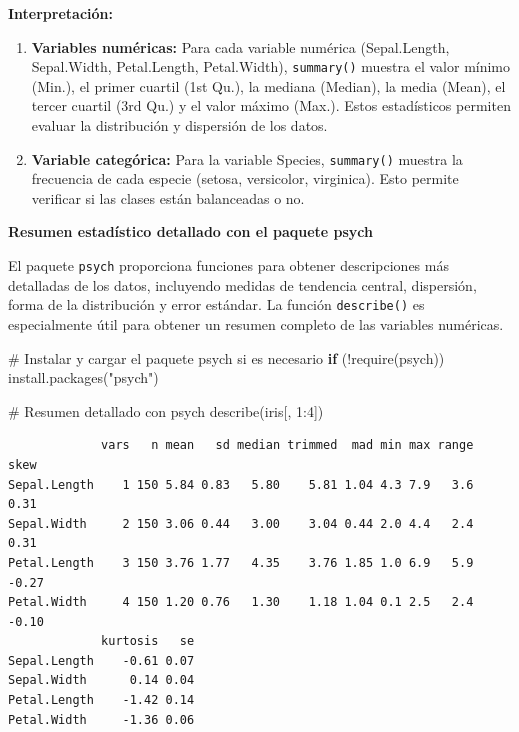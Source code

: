 \documentclass[
  spanish,
  a4paper,
  DIV=11,
  numbers=noendperiod,
  onepage,
  openany]{scrreprt}
\newenvironment{Shaded}{\begin{snugshade}}{\end{snugshade}}
\newcommand{\CommentTok}[1]{\textcolor[rgb]{0.37,0.37,0.37}{#1}}
\newcommand{\ControlFlowTok}[1]{\textcolor[rgb]{0.00,0.23,0.31}{\textbf{#1}}}
\newcommand{\DecValTok}[1]{\textcolor[rgb]{0.68,0.00,0.00}{#1}}
\newcommand{\FunctionTok}[1]{\textcolor[rgb]{0.28,0.35,0.67}{#1}}
\newcommand{\NormalTok}[1]{\textcolor[rgb]{0.00,0.23,0.31}{#1}}
\newcommand{\SpecialCharTok}[1]{\textcolor[rgb]{0.37,0.37,0.37}{#1}}
\newcommand{\StringTok}[1]{\textcolor[rgb]{0.13,0.47,0.30}{#1}}
\begin{document}
\textbf{Interpretación:}

\begin{enumerate}
\def\labelenumi{\arabic{enumi}.}
\item
  \textbf{Variables numéricas:} Para cada variable numérica
  (Sepal.Length, Sepal.Width, Petal.Length, Petal.Width),
  \texttt{summary()} muestra el valor mínimo (Min.), el primer cuartil
  (1st Qu.), la mediana (Median), la media (Mean), el tercer cuartil
  (3rd Qu.) y el valor máximo (Max.). Estos estadísticos permiten
  evaluar la distribución y dispersión de los datos.
\item
  \textbf{Variable categórica:} Para la variable Species,
  \texttt{summary()} muestra la frecuencia de cada especie (setosa,
  versicolor, virginica). Esto permite verificar si las clases están
  balanceadas o no.
\end{enumerate}

\textbf{Resumen estadístico detallado con el paquete psych}

El paquete \texttt{psych} proporciona funciones para obtener
descripciones más detalladas de los datos, incluyendo medidas de
tendencia central, dispersión, forma de la distribución y error
estándar. La función \texttt{describe()} es especialmente útil para
obtener un resumen completo de las variables numéricas.

\begin{Shaded}
\begin{Highlighting}[]
\CommentTok{\# Instalar y cargar el paquete psych si es necesario}
\ControlFlowTok{if}\NormalTok{ (}\SpecialCharTok{!}\FunctionTok{require}\NormalTok{(psych)) }\FunctionTok{install.packages}\NormalTok{(}\StringTok{"psych"}\NormalTok{)}


\CommentTok{\# Resumen detallado con psych}
\FunctionTok{describe}\NormalTok{(iris[, }\DecValTok{1}\SpecialCharTok{:}\DecValTok{4}\NormalTok{])}
\end{Highlighting}
\end{Shaded}

\begin{verbatim}
             vars   n mean   sd median trimmed  mad min max range  skew
Sepal.Length    1 150 5.84 0.83   5.80    5.81 1.04 4.3 7.9   3.6  0.31
Sepal.Width     2 150 3.06 0.44   3.00    3.04 0.44 2.0 4.4   2.4  0.31
Petal.Length    3 150 3.76 1.77   4.35    3.76 1.85 1.0 6.9   5.9 -0.27
Petal.Width     4 150 1.20 0.76   1.30    1.18 1.04 0.1 2.5   2.4 -0.10
             kurtosis   se
Sepal.Length    -0.61 0.07
Sepal.Width      0.14 0.04
Petal.Length    -1.42 0.14
Petal.Width     -1.36 0.06
\end{verbatim}
\end{document}
